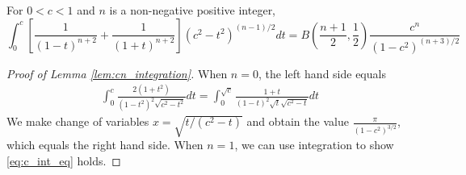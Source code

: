 \documentclass{aptpub}
\begin{document}
\begin{lemma}\label{lem:cn_integration}
For $0<c<1$ and $n$ is a non-negative positive integer,   
\begin{equation}
    \int_0^{c}
    [\frac{1}{(1-t)^{n+2}}+\frac{1}{(1+t)^{n+2}}]
    (c^2- t^2)^{(n-1)/2}dt
    =B(\frac{n+1}{2}, \frac{1}{2})
    \frac{c^n}{(1-c^2)^{(n+3)/2}}
    \end{equation}\label{eq:c_int_eq}
\end{lemma}
\begin{proof}[Proof of Lemma \ref{lem:cn_integration}]
     When $n=0$, the left hand side equals
     \begin{align*}
          \int_0^c \frac{2(1+t^2)}{(1-t^2)^2 \sqrt{c^2-t^2}} dt
          = \int_0^{\sqrt{c}} \frac{1+t}{(1-t)^2 \sqrt{t} \sqrt{c^2-t} }dt
     \end{align*}     
     We make change of variables $x=\sqrt{t/(c^2-t)}$ and obtain
     the value $\frac{\pi}{(1-c^2)^{3/2}}$, which equals
     the right hand side.
     When $n=1$, we can use integration
     to show \eqref{eq:c_int_eq} holds.


\end{proof}
\end{document}
